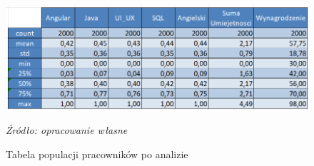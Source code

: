    \begin{figure}[H]
        \centering
        \includegraphics[width=\linewidth]{chapters/Images/analiza_tabela_all.png}
        \cprotect\caption{Tabela populacji pracowników po analizie}
        \textit{Źródło: opracowanie własne} 
        \label{fig:tabela_analiza}
    \end{figure}

